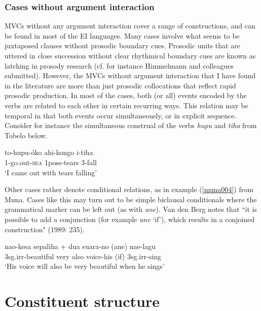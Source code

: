 \subsubsection{Cases without argument interaction}

MVCs without any argument interaction cover a range of constructions, and can be found in most of the EI languages. Many cases involve what seems to be juxtaposed clauses without prosodic boundary cues. Prosodic units that are uttered in close succession without clear rhythmical boundary cues are known as latching in prosody research (cf. for instance Himmelmann and colleagues submitted). However, the MVCs without argument interaction that I have found in the literature are more than just prosodic collocations that reflect rapid prosodic production. In most of the cases, both (or all) events encoded by the verbs are related to each other in certain recurring ways. This relation may be temporal in that both events occur simultaneously, or in explicit sequence.  Consider for instance the simultaneous construal of the verbs \textit{hupu} and \textit{tiha} from Tobelo below.

\ea \label{}
\gll to-hupu-óko ahi-kongo i-tiha \\
1-go.out-\textsc{sea} 1\acs{poss}-tears 3-fall \\
\glft `I came out with tears falling' \\ 
\z
\xe

Other cases rather denote conditional relations, as in example (\ref{muna004}) from Muna. Cases like this may turn out to be simple biclausal conditionals where the grammatical marker can be left out (as with \textit{ane}). Van den Berg notes that ``it is possible to add a conjunction (for example \textit{ane} `if'), which results in a conjoined construction" (1989: 235).

\ea \label{muna004}
\gll nao-kesa sepaliha + dua suara-no (ane) nae-lagu \\
3\acs{sg}.\acs{irr}-beautiful very also voice-his (if) 3\acs{sg}.\acs{irr}-sing \\
\glft `His voice will also be very beautiful when he sings' \\ 
\z
\xe

\section{Constituent structure}

